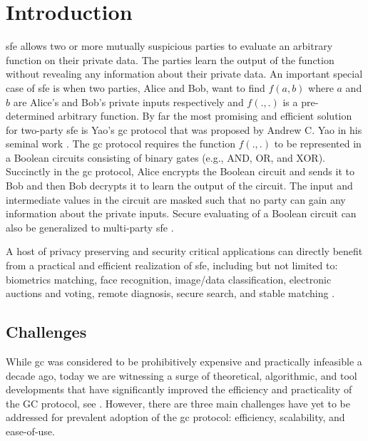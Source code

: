 \chapter{Introduction}
\acrfull{sfe} allows two or more mutually suspicious parties to evaluate an arbitrary function on their private data.
The parties learn the output of the function without revealing any information about their private data.
An important special case of \acrshort{sfe} is when two parties, Alice and Bob, want to find $f(a, b)$ where $a$ and $b$ are Alice's and Bob's private inputs respectively and $f(., .)$ is a pre-determined arbitrary function.
By far the most promising and efficient solution for two-party \acrshort{sfe} is Yao's \acrfull{gc} protocol that was proposed by Andrew C. Yao in his seminal work \cite{yao1986generate}.
The \acrshort{gc} protocol requires the function $f(., .)$ to be represented in a Boolean circuits consisting of binary gates (e.g., AND, OR, and XOR).
Succinctly in the \acrshort{gc} protocol, Alice encrypts the Boolean circuit and sends it to Bob and then Bob decrypts it to learn the output of the circuit.
The input and intermediate values in the circuit are masked such that no party can gain any information about the private inputs.
Secure evaluating of a Boolean circuit can also be generalized to multi-party \acrshort{sfe} \cite{goldreich1987play, ben2008fairplaymp}.

A host of privacy preserving and security critical applications can directly benefit from a practical and efficient realization of \acrshort{sfe}, including but not limited to: biometrics matching, face recognition, image/data classification, electronic auctions and voting, remote diagnosis, secure search, and stable matching \cite{riazi2017toward, zhang2016robust, bringer2013privacy, evans2011efficient, barni2009secure, naor1999privacy, brickell2007privacy, jha2008towards}.

\section{Challenges}
While \acrshort{gc} was considered to be prohibitively expensive and practically infeasible a decade ago, today we are witnessing a surge of theoretical, algorithmic, and tool developments that have significantly improved the efficiency and practicality of the GC protocol, see \cite{malkhi2004fairplay, kolesnikov2008improved, pinkas2009secure, huang2011faster, bellare2013efficient, zahur2015two, zahur2015obliv, liu2015oblivm}.
However, there are three main challenges have yet to be addressed for prevalent adoption of the \acrshort{gc} protocol: efficiency, scalability, and ease-of-use.

